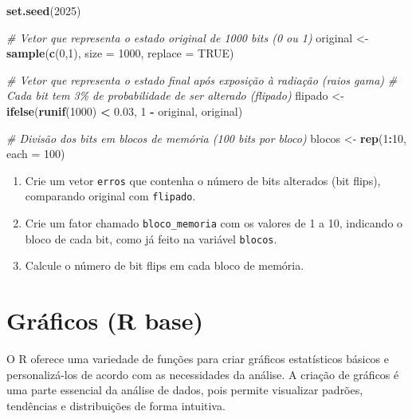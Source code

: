 \documentclass[
]{book}
\newenvironment{Shaded}{\begin{snugshade}}{\end{snugshade}}
\newcommand{\AttributeTok}[1]{\textcolor[rgb]{0.13,0.29,0.53}{#1}}
\newcommand{\CommentTok}[1]{\textcolor[rgb]{0.56,0.35,0.01}{\textit{#1}}}
\newcommand{\ConstantTok}[1]{\textcolor[rgb]{0.56,0.35,0.01}{#1}}
\newcommand{\DecValTok}[1]{\textcolor[rgb]{0.00,0.00,0.81}{#1}}
\newcommand{\FloatTok}[1]{\textcolor[rgb]{0.00,0.00,0.81}{#1}}
\newcommand{\FunctionTok}[1]{\textcolor[rgb]{0.13,0.29,0.53}{\textbf{#1}}}
\newcommand{\NormalTok}[1]{#1}
\newcommand{\OtherTok}[1]{\textcolor[rgb]{0.56,0.35,0.01}{#1}}
\newcommand{\SpecialCharTok}[1]{\textcolor[rgb]{0.81,0.36,0.00}{\textbf{#1}}}
\begin{document}
\begin{Shaded}
\begin{Highlighting}[]
\FunctionTok{set.seed}\NormalTok{(}\DecValTok{2025}\NormalTok{)}

\CommentTok{\# Vetor que representa o estado original de 1000 bits (0 ou 1)}
\NormalTok{original }\OtherTok{\textless{}{-}} \FunctionTok{sample}\NormalTok{(}\FunctionTok{c}\NormalTok{(}\DecValTok{0}\NormalTok{,}\DecValTok{1}\NormalTok{), }\AttributeTok{size =} \DecValTok{1000}\NormalTok{, }\AttributeTok{replace =} \ConstantTok{TRUE}\NormalTok{)}

\CommentTok{\# Vetor que representa o estado final após exposição à radiação (raios gama)}
\CommentTok{\# Cada bit tem 3\% de probabilidade de ser alterado (flipado)}
\NormalTok{flipado }\OtherTok{\textless{}{-}} \FunctionTok{ifelse}\NormalTok{(}\FunctionTok{runif}\NormalTok{(}\DecValTok{1000}\NormalTok{) }\SpecialCharTok{\textless{}} \FloatTok{0.03}\NormalTok{, }\DecValTok{1} \SpecialCharTok{{-}}\NormalTok{ original, original)}

\CommentTok{\# Divisão dos bits em blocos de memória (100 bits por bloco)}
\NormalTok{blocos }\OtherTok{\textless{}{-}} \FunctionTok{rep}\NormalTok{(}\DecValTok{1}\SpecialCharTok{:}\DecValTok{10}\NormalTok{, }\AttributeTok{each =} \DecValTok{100}\NormalTok{)}
\end{Highlighting}
\end{Shaded}

\begin{enumerate}
\def\labelenumi{(\alph{enumi})}
\item
  Crie um vetor \texttt{erros} que contenha o número de bits alterados (bit flips), comparando original com \texttt{flipado}.
\item
  Crie um fator chamado \texttt{bloco\_memoria} com os valores de 1 a 10, indicando o bloco de cada bit, como já feito na variável \texttt{blocos}.
\item
  Calcule o número de bit flips em cada bloco de memória.
\end{enumerate}

\chapter{Gráficos (R base)}\label{gruxe1ficos-r-base}

O R oferece uma variedade de funções para criar gráficos
estatísticos básicos e personalizá-los de acordo com as necessidades da
análise. A criação de gráficos é uma parte essencial da análise de
dados, pois permite visualizar padrões, tendências e distribuições de
forma intuitiva.
\end{document}
